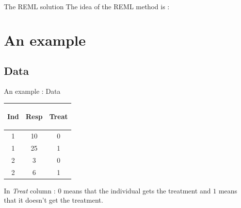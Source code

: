 \documentclass[unknownkeysallowed]{beamer}
\begin{document}
\begin{frame}{The REML solution}
\vspace{1cm}
    The idea of the REML method is : \newline
    \newline
	 \newline
	 \newline
	 \newline
	 \newline
\end{frame}

\section{An example}
\label{sec:example}

\subsection{Data}
\label{sub:Data}

\begin{frame}{An example : Data}
    \begin{table}
        \centering
        \begin{tabular}{| c | c | c|}
        \hline
        \begin{bf} Ind \end{bf} &
        \begin{bf} Resp \end{bf} &
        \begin{bf} Treat \end{bf} \\
        \hline
        1 &  10 & 0\\
        1 & 25 & 1 \\
        2 & 3 & 0 \\
        2 &  6 & 1\\
        \hline
        \end{tabular}
    \end{table}
\vspace{1cm}
In \textit{Treat} column : $0$ means that the individual gets the treatment and $1$ means that it doesn't get the treatment.
\end{frame}
\end{document}
